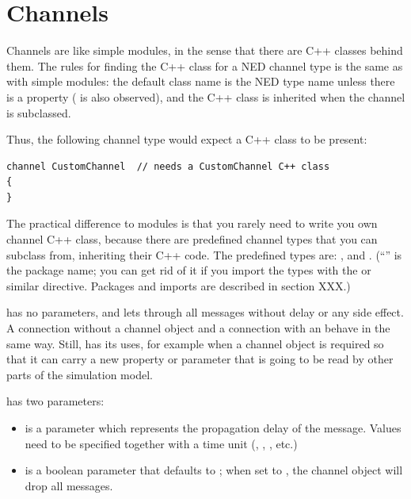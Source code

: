 \section{Channels}
\label{sec:ch-ned-lang:channels}

Channels are like simple modules, in the sense that there are C++ classes
behind them. The rules for finding the C++ class for a NED channel type is
the same as with simple modules: the default class name is the NED type
name unless there is a  property ( is also
observed), and the C++ class is inherited when the channel is subclassed.

Thus, the following channel type would expect a  C++ class
to be present:

\begin{Verbatim}
channel CustomChannel  // needs a CustomChannel C++ class
{
}
\end{Verbatim}

The practical difference to modules is that you rarely need to write you own
channel C++ class, because there are predefined channel types that you can
subclass from, inheriting their C++ code. The predefined types are:
,  and .
(``'' is the package name; you can get rid of it if you import the types
with the  or similar directive. Packages and imports
are described in section XXX.)

 has no parameters, and lets through all messages without
delay or any side effect. A connection without a channel object
and a connection with an  behave in the same way.
Still,  has its uses, for example when a channel object
is required so that it can carry a new property or parameter that is
going to be read by other parts of the simulation model.

 has two parameters:

\begin{itemize}
    \item {} is a  parameter which represents the
          propagation delay of the message. Values need to be specified
          together with a time unit (, , , etc.)
    \item {} is a boolean parameter that defaults to ;
          when set to , the channel object will drop all messages.
\end{itemize}

